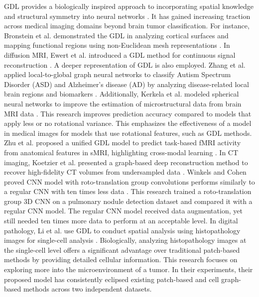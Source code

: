 \documentclass[10pt,twocolumn,letterpaper]{article}
\begin{document}
GDL provides a biologically inspired approach to incorporating spatial knowledge and structural symmetry into neural networks \cite{19,20,21}. It has gained increasing traction across medical imaging domains beyond brain tumor classification. For instance, Bronstein et al. demonstrated the GDL in analyzing cortical surfaces and mapping functional regions using non-Euclidean mesh representations \cite{22}. In diffusion MRI, Ewert et al. introduced a GDL method for continuous signal reconstruction \cite{23}. A deeper representation of GDL is also employed. Zhang et al. applied local-to-global graph neural networks to classify Autism Spectrum Disorder (ASD) and Alzheimer's disease (AD) by analyzing disease-related local brain regions and biomarkers \cite{24}. Additionally, Kerkela et al. modeled spherical neural networks to improve the estimation of microstructural data from brain MRI data \cite{25}. This research improves prediction accuracy compared to models that apply less or no rotational variance. This emphasizes the effectiveness of a model in medical images for models that use rotational features, such as GDL methods. Zhu et al. proposed a unified GDL model to predict task-based fMRI activity from anatomical features in sMRI, highlighting cross-modal learning \cite{26}. In CT imaging, Koetzier et al. presented a graph-based deep reconstruction method to recover high-fidelity CT volumes from undersampled data \cite{27}. Winkels and Cohen proved CNN model with roto-translation group convolutions performs similarly to a regular CNN with ten times less data \cite{28}. This research trained a roto-translation group 3D CNN on a pulmonary nodule detection dataset and compared it with a regular CNN model. The regular CNN model received data augmentation, yet still needed ten times more data to perform at an acceptable level. In digital pathology, Li et al. use GDL to conduct spatial analysis using histopathology images for single-cell analysis \cite{29}. Biologically, analyzing histopathology images at the single-cell level offers a significant advantage over traditional patch-based methods by providing detailed cellular information. This research focuses on exploring more into the microenvironment of a tumor. In their experiments, their proposed model has consistently eclipsed existing patch-based and cell graph-based methods across two independent datasets.
\end{document}
